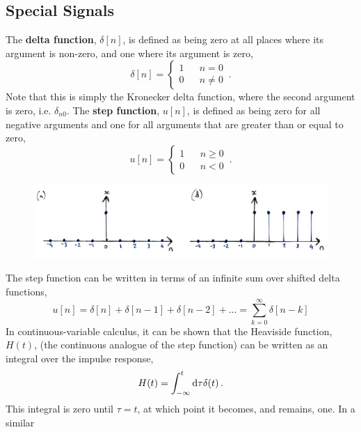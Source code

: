 \subsection{Special Signals}
%
The \textbf{delta function}, $\delta[n]$, is defined as being zero at all places where its argument
is non-zero, and one where its argument is zero,
%
\begin{equation}
  \delta[n] = \left\{\begin{array}{ccl}
    1 & & n = 0 \\
    0 & & n \neq 0
  \end{array}\right. \,.
\end{equation}
%
Note that this is simply the Kronecker delta function, where the second argument is zero, i.e. $\delta_{n0}$.
The \textbf{step function}, $u[n]$, is defined as being zero for all negative arguments and one for
all arguments that are greater than or equal to zero,
%
\begin{equation}
  u[n] = \left\{\begin{array}{ccl}
    1 & & n \geq 0 \\
    0 & & n < 0
  \end{array}\right. \,.
\end{equation}
%
\begin{figure}[!htb]
  \includegraphics[width=\textwidth]{images/lecture_1_delta_and_step.JPG}
  \caption{
  }
  \label{fig::lecture_1_step_function}
\end{figure}
%
The step function can be written in terms of an infinite sum over shifted delta functions,
%
\begin{equation}
  u[n] = \delta[n] + \delta[n-1] + \delta[n-2] + \hdots = \sum_{k=0}^\infty \delta[n-k]
\end{equation}
%
In continuous-variable calculus, it can be shown that the Heaviside function, $H(t)$, (the continuous
analogue of the step function) can be written as an integral over the impulse response,
%
\begin{displaymath}
  H(t) = \int^t_{-\infty} \mathrm{d}\tau\delta(t) \,.
\end{displaymath}
%
This integral is zero until $\tau = t$, at which point it becomes, and remains, one. In a similar
